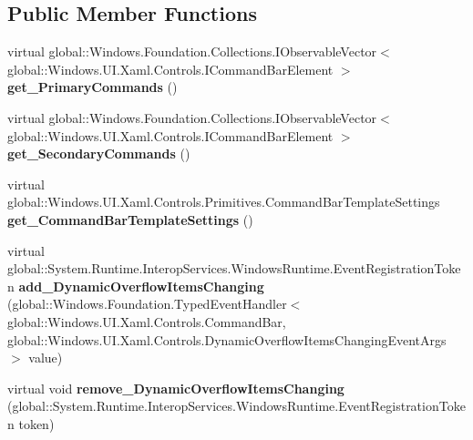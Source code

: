 \subsection*{Public Member Functions}
\begin{DoxyCompactItemize}
\item 
\mbox{\label{class_windows_1_1_u_i_1_1_xaml_1_1_controls_1_1_command_bar_ae88ea6c40bfe9ef1b7d7ddbc13b1f9b9}} 
virtual global\+::\+Windows.\+Foundation.\+Collections.\+I\+Observable\+Vector$<$ global\+::\+Windows.\+U\+I.\+Xaml.\+Controls.\+I\+Command\+Bar\+Element $>$ {\bfseries get\+\_\+\+Primary\+Commands} ()
\item 
\mbox{\label{class_windows_1_1_u_i_1_1_xaml_1_1_controls_1_1_command_bar_a072695ed5c57aaec6c85a771fab759a9}} 
virtual global\+::\+Windows.\+Foundation.\+Collections.\+I\+Observable\+Vector$<$ global\+::\+Windows.\+U\+I.\+Xaml.\+Controls.\+I\+Command\+Bar\+Element $>$ {\bfseries get\+\_\+\+Secondary\+Commands} ()
\item 
\mbox{\label{class_windows_1_1_u_i_1_1_xaml_1_1_controls_1_1_command_bar_a3c347a4844a2ab249e968e1e53766ab0}} 
virtual global\+::\+Windows.\+U\+I.\+Xaml.\+Controls.\+Primitives.\+Command\+Bar\+Template\+Settings {\bfseries get\+\_\+\+Command\+Bar\+Template\+Settings} ()
\item 
\mbox{\label{class_windows_1_1_u_i_1_1_xaml_1_1_controls_1_1_command_bar_a1a44ae0c71e258f2cf660c142388ef5a}} 
virtual global\+::\+System.\+Runtime.\+Interop\+Services.\+Windows\+Runtime.\+Event\+Registration\+Token {\bfseries add\+\_\+\+Dynamic\+Overflow\+Items\+Changing} (global\+::\+Windows.\+Foundation.\+Typed\+Event\+Handler$<$ global\+::\+Windows.\+U\+I.\+Xaml.\+Controls.\+Command\+Bar, global\+::\+Windows.\+U\+I.\+Xaml.\+Controls.\+Dynamic\+Overflow\+Items\+Changing\+Event\+Args $>$ value)
\item 
\mbox{\label{class_windows_1_1_u_i_1_1_xaml_1_1_controls_1_1_command_bar_a0c78fff54eb4b6fe6739fa33dedab6f5}} 
virtual void {\bfseries remove\+\_\+\+Dynamic\+Overflow\+Items\+Changing} (global\+::\+System.\+Runtime.\+Interop\+Services.\+Windows\+Runtime.\+Event\+Registration\+Token token)

\end{DoxyCompactItemize}
